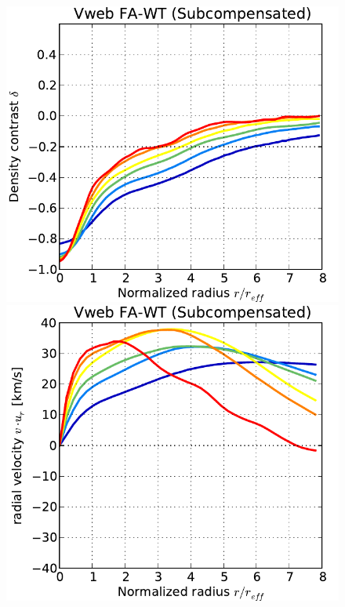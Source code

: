 \documentclass[a4,useAMS,usenatbib,usegraphicx]{latex/mn2e}
\begin{document}
\begin{figure}
  \includegraphics[trim = 1mm 0mm 5mm 0mm, clip, keepaspectratio=true,
  width=0.24\textheight]{./figures/voids_density_VwebFAG0.pdf}
  \includegraphics[trim = 1mm 0mm 5mm 0mm, clip, keepaspectratio=true,
  width=0.24\textheight]{./figures/voids_velocity_VwebFAG0.pdf}

\end{figure}
\end{document}
